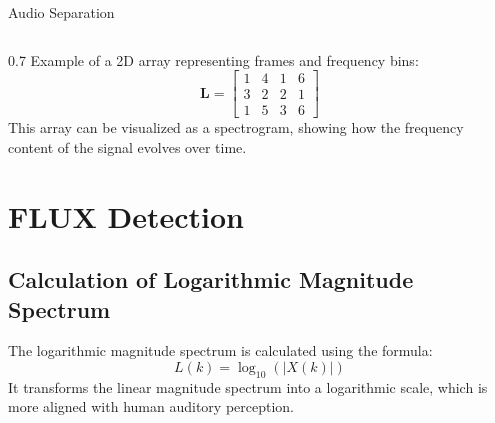 \documentclass[aspectratio=169]{beamer}
\begin{document}
\begin{frame}{Audio Separation}
\begin{columns}[T]
\begin{column}{0.7\textwidth}
        \noindent Example of a 2D array representing frames and frequency bins:
        \[
        \mathbf{L} =
        \begin{bmatrix}
                1 & 4 & 1 & 6 \\
                3 & 2 & 2 & 1 \\
                1 & 5 & 3 & 6
        \end{bmatrix}
        \]
        \noindent This array can be visualized as a spectrogram, showing how the frequency content of the signal evolves over time.
    

\section{FLUX Detection}

    \subsection{Calculation of Logarithmic Magnitude Spectrum}

        The logarithmic magnitude spectrum is calculated using the formula:
        \begin{equation}
            L(k) = \log_{10}(|X(k)|)
        \end{equation}
        It transforms the linear magnitude spectrum into a logarithmic scale,
        which is more aligned with human auditory perception.


\end{column}
\end{columns}
\end{frame}
\end{document}
